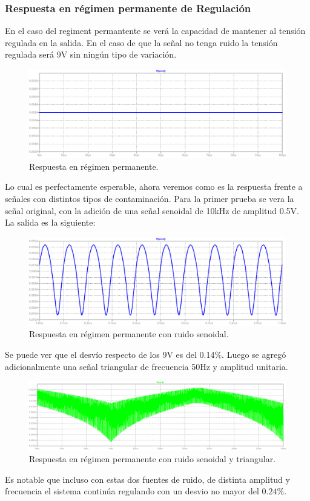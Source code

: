 \subsubsection{Respuesta en régimen permanente de Regulación}
En el caso del regiment permantente se verá la capacidad de mantener al tensión regulada en la salida.
En el caso de que la señal no tenga ruido la tensión regulada será 9V sin ningún tipo de variación.
\begin{figure}[H]
\centering
	\includegraphics[width=1\textwidth]{ImagenesEjercicio2/permresp.png}
	\caption{Respuesta en régimen permanente.}
	\label{fig:permanenteFuente}
\end{figure}
Lo cual es perfectamente esperable, ahora veremos como es la respuesta frente a señales con distintos tipos de contaminación.
Para la primer prueba se vera la señal original, con la adición de una señal senoidal de 10kHz de amplitud 0.5V.
La salida es la siguiente:
\begin{figure}[H]
\centering
	\includegraphics[width=1\textwidth]{ImagenesEjercicio2/permrespsine.png}
	\caption{Respuesta en régimen permanente con ruido senoidal.}
	\label{fig:permanenteFuentesine}
\end{figure}
Se puede ver que el desvío respecto de los 9V es del 0.14$\%$.
Luego se agregó adicionalmente una señal triangular de frecuencia 50Hz y amplitud unitaria.
\begin{figure}[H]
\centering
	\includegraphics[width=1\textwidth]{ImagenesEjercicio2/permrespsinetri.png}
	\caption{Respuesta en régimen permanente con ruido senoidal y triangular.}
	\label{fig:permanenteFuentesinetri}
\end{figure}
Es notable que incluso con estas dos fuentes de ruido, de distinta amplitud y frecuencia el sistema continúa regulando con un desvio no mayor del $0.24\%$.
